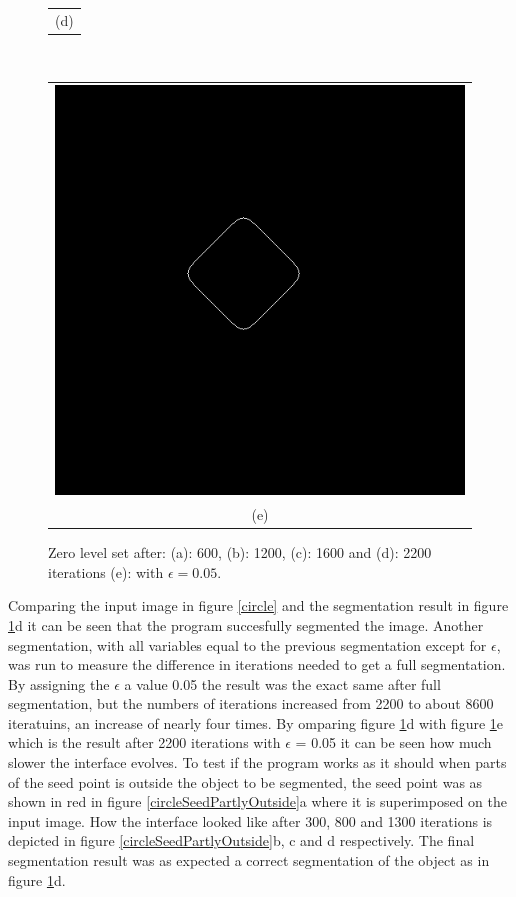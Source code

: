 \begin{figure}[h!]
\begin{minipage}{.49\textwidth}
\begin{tabular}{c}
(d)
\end{tabular}
\end{minipage}
\\
\begin{minipage}{.49\textwidth}
\begin{tabular}{c}
\includegraphics[width=.9\textwidth]{results/circleEps005} \\
(e)
\end{tabular}
\end{minipage}
\caption{Zero level set after: (a): 600, (b): 1200, (c): 1600 and (d): 2200 iterations (e): with $\epsilon=0.05$.}
\label{circleZeroMany}
\end{figure}
Comparing the input image in figure \ref{circle} and the segmentation result in figure \ref{circleZeroMany}d it can be seen that the program succesfully segmented the image.
Another segmentation, with all variables equal to the previous segmentation except for $\epsilon$, was run to measure the difference in iterations needed to get a full segmentation. By assigning the $\epsilon$ a value 0.05 the result was the exact same after full segmentation, but the numbers of iterations increased from 2200 to about 8600 iteratuins, an increase of nearly four times. By omparing figure \ref{circleZeroMany}d with figure \ref{circleZeroMany}e which is the result after 2200 iterations with $\epsilon$ = 0.05 it can be seen how much slower the interface evolves.
To test if the program works as it should when parts of the seed point is outside the object to be segmented, the seed point was as shown in red in figure \ref{circleSeedPartlyOutside}a where it is superimposed on the input image. How the interface looked like after 300, 800 and 1300 iterations is depicted in figure \ref{circleSeedPartlyOutside}b, c and d respectively. The final segmentation result was as expected a correct segmentation of the object as in figure \ref{circleZeroMany}d. 
